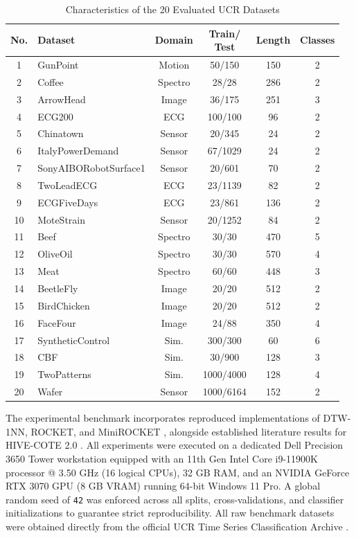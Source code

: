 \documentclass[conference]{IEEEtran}
\newcommand{\ieeetableformat}{%
  \footnotesize
  \setlength{\tabcolsep}{3pt}%
  \renewcommand{\arraystretch}{1.05}%
}
\begin{document}
\begin{table}[!t]
\caption{Characteristics of the 20 Evaluated UCR Datasets}
\label{tab:dataset_sizes}
\centering
\ieeetableformat
\begin{tabular*}{\columnwidth}{@{\extracolsep{\fill}}|c|l|c|c|c|c|}
\hline
\textbf{No.} & \textbf{Dataset} & \textbf{Domain} & \shortstack{\textbf{Train/}\\\textbf{Test}} & \textbf{Length} & \textbf{Classes} \\ \hline
1 & GunPoint & Motion & 50/150 & 150 & 2 \\
2 & Coffee & Spectro & 28/28 & 286 & 2 \\
3 & ArrowHead & Image & 36/175 & 251 & 3 \\
4 & ECG200 & ECG & 100/100 & 96 & 2 \\
5 & Chinatown & Sensor & 20/345 & 24 & 2 \\
6 & ItalyPowerDemand & Sensor & 67/1029 & 24 & 2 \\
7 & SonyAIBORobotSurface1 & Sensor & 20/601 & 70 & 2 \\
8 & TwoLeadECG & ECG & 23/1139 & 82 & 2 \\
9 & ECGFiveDays & ECG & 23/861 & 136 & 2 \\
10 & MoteStrain & Sensor & 20/1252 & 84 & 2 \\
11 & Beef & Spectro & 30/30 & 470 & 5 \\
12 & OliveOil & Spectro & 30/30 & 570 & 4 \\
13 & Meat & Spectro & 60/60 & 448 & 3 \\
14 & BeetleFly & Image & 20/20 & 512 & 2 \\
15 & BirdChicken & Image & 20/20 & 512 & 2 \\
16 & FaceFour & Image & 24/88 & 350 & 4 \\
17 & SyntheticControl & Sim. & 300/300 & 60 & 6 \\
18 & CBF & Sim. & 30/900 & 128 & 3 \\
19 & TwoPatterns & Sim. & 1000/4000 & 128 & 4 \\
20 & Wafer & Sensor & 1000/6164 & 152 & 2 \\ \hline
\end{tabular*}
\end{table}

The experimental benchmark incorporates reproduced implementations of DTW-1NN, ROCKET, and MiniROCKET \cite{dempster2021}, alongside established literature results for HIVE-COTE 2.0 \cite{middlehurst2021}. All experiments were executed on a dedicated Dell Precision 3650 Tower workstation equipped with an 11th Gen Intel Core i9-11900K processor @ 3.50 GHz (16 logical CPUs), 32 GB RAM, and an NVIDIA GeForce RTX 3070 GPU (8 GB VRAM) running 64-bit Windows 11 Pro. A global random seed of \texttt{42} was enforced across all splits, cross-validations, and classifier initializations to guarantee strict reproducibility. All raw benchmark datasets were obtained directly from the official UCR Time Series Classification Archive \cite{dau2019}.
\end{document}
